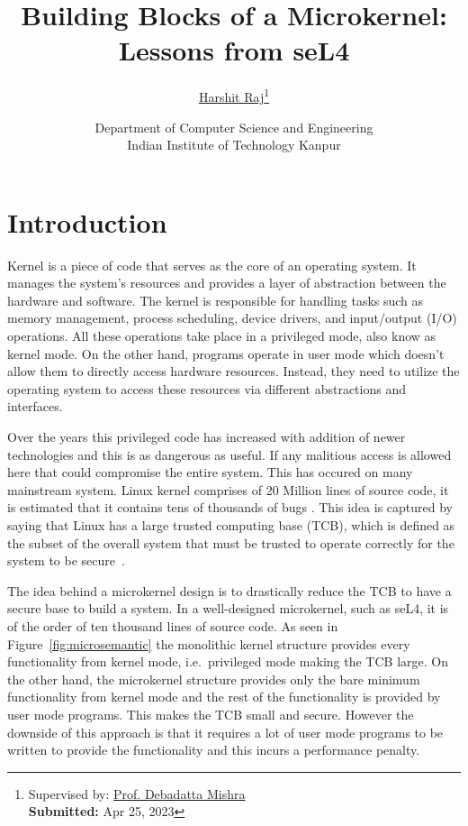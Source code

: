 \documentclass[
	a4paper, %
	11pt, %
	unnumberedsections, %
	twoside, %
]{LTJournalArticle}
\title{Building Blocks of a Microkernel: \\ Lessons from seL4} %
\author{%
	\href{https://1-Harshit.github.io/}{Harshit Raj}\thanks{Supervised by: \href{https://www.cse.iitk.ac.in/users/deba/}{Prof. Debadatta Mishra}\\ \textbf{Submitted:} Apr 25, 2023}
}
\date{\footnotesize Department of Computer Science and Engineering \\ Indian Institute of Technology Kanpur}
\begin{document}
\maketitle %


\section{Introduction}

Kernel is a piece of code that serves as the core of an operating system. It manages the system's resources and provides a layer of abstraction between the hardware and software. The kernel is responsible for handling tasks such as memory management, process scheduling, device drivers, and input/output (I/O) operations. All these operations take place in a privileged mode, also know as kernel mode. On the other hand, programs operate in user mode which doesn't allow them to directly access hardware resources. Instead, they need to utilize the operating system to access these resources via different abstractions and interfaces.

Over the years this privileged code has increased with addition of newer technologies and this is as dangerous as useful. If any malitious access is allowed here that could compromise the entire system. This has occured on many mainstream system. Linux kernel comprises of 20 Million lines of source code, it is estimated that it contains tens of thousands of bugs \cite{Biggs:2018}. This idea is captured by saying that Linux has a large trusted computing base (TCB), which is defined as the subset of the overall system that must be trusted to operate correctly for the system to be secure~\cite{Heiser:2020}.

The idea behind a microkernel design is to drastically reduce the TCB to have a secure base to build a system. In a well-designed microkernel, such as seL4, it is of the order of ten thousand lines of source code. As seen in Figure~\ref{fig:microsemantic} the monolithic kernel structure provides every functionality from kernel mode, i.e.\ privileged mode making the TCB large. On the other hand, the microkernel structure provides only the bare minimum functionality from kernel mode and the rest of the functionality is provided by user mode programs. This makes the TCB small and secure. However the downside of this approach is that it requires a lot of user mode programs to be written to provide the functionality and this incurs a performance penalty.
\end{document}
